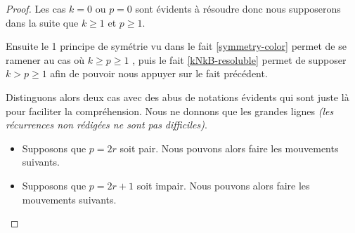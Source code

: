 \begin{proof}
    Les cas $k = 0$ ou $p = 0$ sont évidents à résoudre donc nous supposerons dans la suite que $k \geq 1$ et $p \geq 1$.

    \medskip

    Ensuite le 1\ier{} principe de symétrie vu dans le fait \ref{symmetry-color} permet de se ramener au cas où $k \geq p \geq 1$ ,
    puis le fait \ref{kNkB-resoluble} permet de supposer $k > p \geq 1$ afin de pouvoir nous appuyer sur le fait précédent.

    \medskip

    \noindent
    Distinguons alors deux cas avec des abus de notations évidents qui sont juste là pour faciliter la compréhension. Nous ne donnons que les grandes lignes \emph{(les récurrences non rédigées ne sont pas difficiles)}.

    \begin{itemize}[label=\small\textbullet]
        \item  Supposons que $p = 2r$ soit pair. Nous pouvons alors faire les mouvements suivants.


        \item  Supposons que $p = 2r+1$ soit impair. Nous pouvons alors faire les mouvements suivants.
\end{itemize}
\end{proof}
